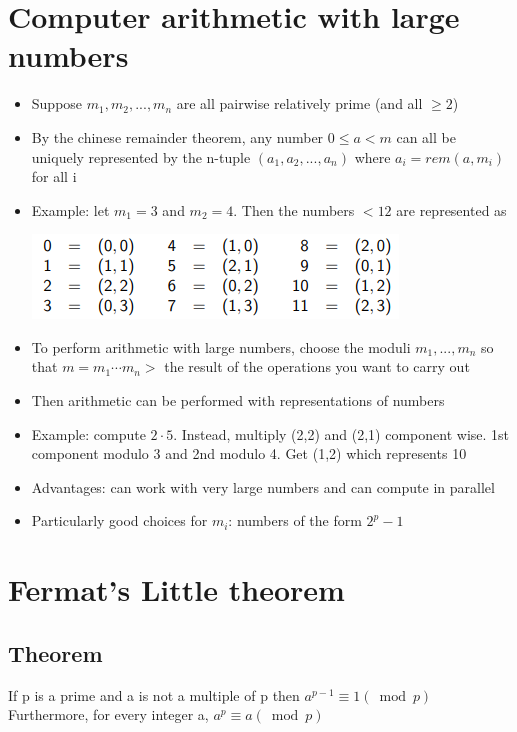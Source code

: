 \documentclass{article}[18pt]
\begin{document}
\section{Computer arithmetic with large numbers}
\begin{itemize}
	\item Suppose $m_1,m_2,...,m_n$ are all pairwise relatively prime (and all $\geqslant 2$)
	\item By the chinese remainder theorem, any number $0\leqslant a <m$ can all be uniquely represented by the n-tuple $(a_1,a_2,...,a_n)$ where $a_i=rem(a,m_i)$ for all i
	\item Example: let $m_1=3$ and $m_2=4$. Then the numbers $<12$ are represented as
	\begin{center}
		\includegraphics[scale=0.7]{numbers}
	\end{center}
	\item To perform arithmetic with large numbers, choose the moduli $m_1,...,m_n$ so that $m=m_1\cdots m_n>$ the result of the operations you want to carry out
	\item Then arithmetic can be performed with representations of numbers
	\item Example: compute $2\cdot 5$. Instead, multiply (2,2) and (2,1) component wise. 1st component modulo 3 and 2nd modulo 4. Get (1,2) which represents 10
	\item Advantages: can work with very large numbers and can compute in parallel
	\item Particularly good choices for $m_i$: numbers of the form $2^p-1$
\end{itemize} 
\section{Fermat's Little theorem}
\subsection{Theorem}
If p is a prime and a is not a multiple of p then $a^{p-1}\equiv 1 (\bmod p)$\\
Furthermore, for every integer a, $a^p\equiv a (\bmod p)$
\end{document}
